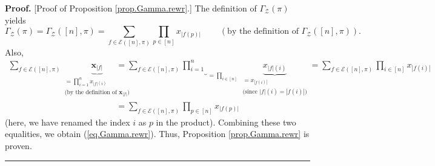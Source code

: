 \documentclass[numbers=enddot,12pt,final,onecolumn,notitlepage]{scrartcl}%
\theoremstyle{definition}
\newenvironment{proof}[1][Proof]{\noindent\textbf{#1.} }{\ \rule{0.5em}{0.5em}}
\newenvironment{verlong}{}{}
\let\sumnonlimits\sum
\let\prodnonlimits\prod
\renewcommand{\sum}{\sumnonlimits\limits}
\renewcommand{\prod}{\prodnonlimits\limits}
\begin{document}
\begin{verlong}
\begin{proof}
[Proof of Proposition \ref{prop.Gamma.rewr}.] The definition of $\Gamma
_{\mathcal{Z}}\left(  \pi\right)  $ yields%
\[
\Gamma_{\mathcal{Z}}\left(  \pi\right)  =\Gamma_{\mathcal{Z}}\left(  \left[
n\right]  ,\pi\right)  =\sum_{f\in\mathcal{E}\left(  \left[  n\right]
,\pi\right)  }\prod_{p\in\left[  n\right]  }x_{\left\vert f\left(  p\right)
\right\vert }\ \ \ \ \ \ \ \ \ \ \left(  \text{by the definition of }%
\Gamma_{\mathcal{Z}}\left(  \left[  n\right]  ,\pi\right)  \right)  .
\]
Also,%
\begin{align*}
\sum_{f\in\mathcal{E}\left(  \left[  n\right]  ,\pi\right)  }%
\underbrace{\mathbf{x}_{\left\vert f\right\vert }}_{\substack{=\prod_{i=1}%
^{n}x_{\left\vert f\right\vert \left(  i\right)  }\\\text{(by the definition
of }\mathbf{x}_{\left\vert f\right\vert }\text{)}}}  & =\sum_{f\in
\mathcal{E}\left(  \left[  n\right]  ,\pi\right)  }\underbrace{\prod_{i=1}%
^{n}}_{=\prod_{i\in\left[  n\right]  }}\underbrace{x_{\left\vert f\right\vert
\left(  i\right)  }}_{\substack{=x_{\left\vert f\left(  i\right)  \right\vert
}\\\text{(since }\left\vert f\right\vert \left(  i\right)  =\left\vert
f\left(  i\right)  \right\vert \text{)}}}=\sum_{f\in\mathcal{E}\left(  \left[
n\right]  ,\pi\right)  }\prod_{i\in\left[  n\right]  }x_{\left\vert f\left(
i\right)  \right\vert }\\
& =\sum_{f\in\mathcal{E}\left(  \left[  n\right]  ,\pi\right)  }\prod
_{p\in\left[  n\right]  }x_{\left\vert f\left(  p\right)  \right\vert }%
\end{align*}
(here, we have renamed the index $i$ as $p$ in the product). Combining these
two equalities, we obtain (\ref{eq.Gamma.rewr}). Thus, Proposition
\ref{prop.Gamma.rewr} is proven.
\end{proof}
\end{verlong}
\end{document}
